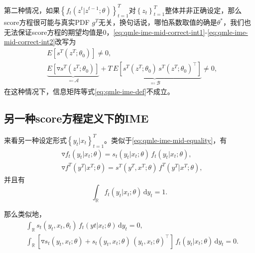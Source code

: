 第二种情况，如果$\left\{ f_{t} \left(z^{t}|z^{t-1} ; \theta \right) \right\}_{t=1}^{T}$对$\left\{ z_{t} \right\}_{t=1}^{T}$整体并非正确设定，那么score方程很可能与真实PDF $g^{T}$无关，换句话说，哪怕系数取值的确是$\theta^{*}$，我们也无法保证score方程的期望均值是$0$，\eqref{eq:qmle-ime-mid-correct-int1}-\eqref{eq:qmle-ime-mid-correct-int2}改写为
\begin{align}
    \label{eq:qmle-ime-mid-incorrect-int1}
    & E \left[ s^{T} \left( z^{T} ; \theta_{0} \right) \right] \neq 0, \\
    \label{eq:qmle-ime-mid-incorrect-int2}
    & \underbrace{
    E \left[
    \triangledown s^{T} \left( z^{T} ; \theta_{0} \right)
    \right]
    }_{\eqqcolon \mathcal{A}}
     + \underbrace{
     T \, E
    \left[
    s^{T} \left( z^{T}; \theta_{0} \right) \,
    s^{T} \left( z^{T}; \theta_{0} \right)^{\top}
    \right]
    }_{\eqqcolon \mathcal{B}}
     \neq 0,
\end{align}
在这种情况下，信息矩阵等式\eqref{eq:qmle-ime-def}不成立。

\subsection{另一种score方程定义下的IME}
\label{eq:qlme-ime-yx}
来看另一种设定形式$\left\{ y_{t} | x_{t} \right\}_{t=1}^{T}$。类似于\eqref{eq:qmle-ime-mid-equality}，有
\begin{align}
    \label{eq:qmle-ime-mid-equality-yx-single}
    & \triangledown f_{t} \left( y_{t} | x_{t}; \theta \right) = s_{t} \left(y_{t} | x_{t}; \theta \right) \, f_{t} \left( y_{t} | x_{t}; \theta \right), \\
    \label{eq:qmle-ime-mid-equality-yx-sum}
    & \triangledown f^{T} \left( y^{T} | x^{T}; \theta \right) = s^{T} \left(y^{T} , x^{T}; \theta \right) \, f^{T} \left( y^{T} | x^{T}; \theta \right),
\end{align}
并且有
\begin{equation*}
  \int_{\mathbb{R}} f_{t} \left(y_{t} | x_{t} ; \theta \right) \, \mathrm{d} y_{t} =1.
\end{equation*}

那么类似地，
\begin{equation*}
  \begin{split}
    & \int_{\mathbb{R}} s_{t} \left(y_{t}, x_{t}, \theta_{t} \right) \,
    f_{t} \left( y{t} | x_{t} ; \theta \right) \, \mathrm{d} y_{t} =0, \\
    & \int_{\mathbb{R}}
    \left[
    \triangledown s_{t} \left( y_{t}, x_{t}; \theta \right)
    + s_{t} \left( y_{t}, x_{t}; \theta \right) \,
    \left( y_{t}, x_{t}; \theta \right)^{\top}
    \right]
    \, f_{t} \left( y_{t} | x_{t}; \theta \right)
    \, \mathrm{d} y_{t} =0.
  \end{split}
\end{equation*}


